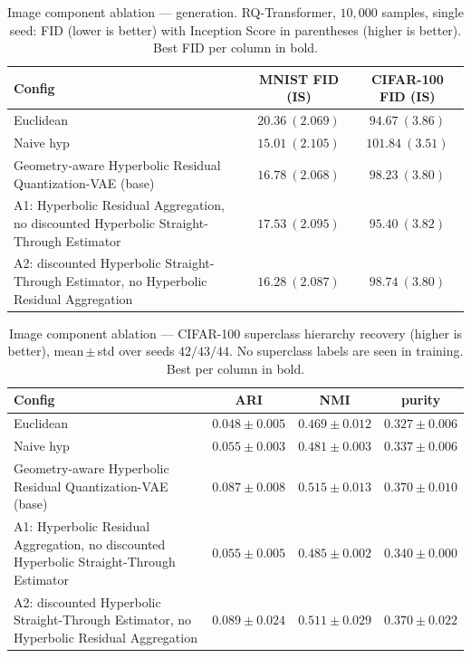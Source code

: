 \documentclass[12pt]{report}
\begin{document}
\begin{table}[h]
\centering
\caption{Image component ablation --- generation. RQ-Transformer, $10{,}000$ samples, single seed: FID (lower is better) with Inception Score in parentheses (higher is better). Best FID per column in bold.}
\label{tab:abl_img_gen}
\begin{tabular}{lcc}
\hline
Config & MNIST FID (IS) & CIFAR-100 FID (IS) \\
\hline
Euclidean            & $20.36\ (2.069)$ & $\mathbf{94.67}\ (3.86)$ \\
Naive hyp          & $\mathbf{15.01}\ (2.105)$ & $101.84\ (3.51)$ \\
Geometry-aware Hyperbolic Residual Quantization-VAE (base)     & $16.78\ (2.068)$ & $98.23\ (3.80)$ \\
A1: Hyperbolic Residual Aggregation, no discounted Hyperbolic Straight-Through Estimator   & $17.53\ (2.095)$ & $95.40\ (3.82)$ \\
A2: discounted Hyperbolic Straight-Through Estimator, no Hyperbolic Residual Aggregation   & $16.28\ (2.087)$ & $98.74\ (3.80)$ \\
\hline
\end{tabular}
\end{table}

\begin{table}[h]
\centering
\caption{Image component ablation --- CIFAR-100 superclass hierarchy recovery (higher is better), mean\,$\pm$\,std over seeds $42/43/44$. No superclass labels are seen in training. Best per column in bold.}
\label{tab:abl_img_hier}
\begin{tabular}{lccc}
\hline
Config & ARI & NMI & purity \\
\hline
Euclidean            & $0.048 \pm 0.005$ & $0.469 \pm 0.012$ & $0.327 \pm 0.006$ \\
Naive hyp          & $0.055 \pm 0.003$ & $0.481 \pm 0.003$ & $0.337 \pm 0.006$ \\
Geometry-aware Hyperbolic Residual Quantization-VAE (base)     & $0.087 \pm 0.008$ & $\mathbf{0.515 \pm 0.013}$ & $\mathbf{0.370 \pm 0.010}$ \\
A1: Hyperbolic Residual Aggregation, no discounted Hyperbolic Straight-Through Estimator   & $0.055 \pm 0.005$ & $0.485 \pm 0.002$ & $0.340 \pm 0.000$ \\
A2: discounted Hyperbolic Straight-Through Estimator, no Hyperbolic Residual Aggregation   & $\mathbf{0.089 \pm 0.024}$ & $0.511 \pm 0.029$ & $\mathbf{0.370 \pm 0.022}$ \\
\hline
\end{tabular}
\end{table}
\end{document}
